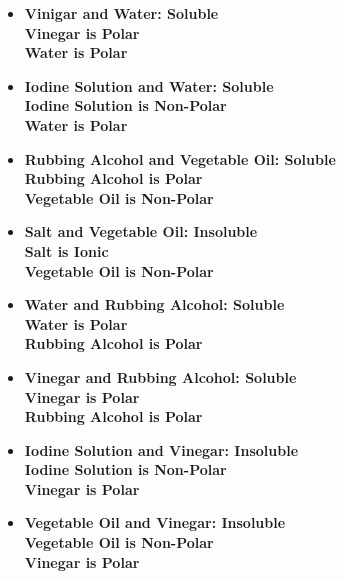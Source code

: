 \begin{itemize}
  \item \bf{Vinigar} and \bf{Water}:
    Soluble \\
    \bf{Vinegar} is \bf{Polar} \\
    \bf{Water} is \bf{Polar}

  \item \bf{Iodine Solution} and \bf{Water}:
    Soluble \\
    \bf{Iodine Solution} is \bf{Non-Polar} \\
    \bf{Water} is \bf{Polar}

  \item \bf{Rubbing Alcohol} and \bf{Vegetable Oil}:
    Soluble \\
    \bf{Rubbing Alcohol} is \bf{Polar} \\
    \bf{Vegetable Oil} is \bf{Non-Polar}

  \item \bf{Salt} and \bf{Vegetable Oil}:
    Insoluble \\
    \bf{Salt} is \bf{Ionic} \\
    \bf{Vegetable Oil} is \bf{Non-Polar}

  \item \bf{Water} and \bf{Rubbing Alcohol}:
    Soluble \\
    \bf{Water} is \bf{Polar} \\
    \bf{Rubbing Alcohol} is \bf{Polar} \\

  \item \bf{Vinegar} and \bf{Rubbing Alcohol}:
    Soluble \\
    \bf{Vinegar} is \bf{Polar} \\
    \bf{Rubbing Alcohol} is \bf{Polar} \\

  \item \bf{Iodine Solution} and \bf{Vinegar}:
    Insoluble \\
    \bf{Iodine Solution} is \bf{Non-Polar} \\
    \bf{Vinegar} is \bf{Polar} \\

  \item \bf{Vegetable Oil} and \bf{Vinegar}:
    Insoluble \\
    \bf{Vegetable Oil} is \bf{Non-Polar} \\
    \bf{Vinegar} is \bf{Polar} \\
\end{itemize}

